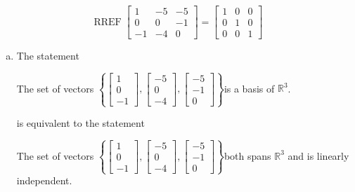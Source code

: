 \begin{exerciseAnswer} 


\[\operatorname{RREF} \left[\begin{array}{ccc}
1 & -5 & -5 \\
0 & 0 & -1 \\
-1 & -4 & 0
\end{array}\right] = \left[\begin{array}{ccc}
1 & 0 & 0 \\
0 & 1 & 0 \\
0 & 0 & 1
\end{array}\right] \]


\begin{enumerate}[(a)]
\item The statement 
\begin{center}\begin{minipage}{0.8\textwidth}
 The set of vectors \( \left\{ \left[\begin{array}{c}
1 \\
0 \\
-1
\end{array}\right] , \left[\begin{array}{c}
-5 \\
0 \\
-4
\end{array}\right] , \left[\begin{array}{c}
-5 \\
-1 \\
0
\end{array}\right] \right\} \)is a basis of \(\mathbb{R}^3\). 
\end{minipage}\end{center}
     is equivalent to the statement 
\begin{center}\begin{minipage}{0.8\textwidth}
 The set of vectors \( \left\{ \left[\begin{array}{c}
1 \\
0 \\
-1
\end{array}\right] , \left[\begin{array}{c}
-5 \\
0 \\
-4
\end{array}\right] , \left[\begin{array}{c}
-5 \\
-1 \\
0
\end{array}\right] \right\} \)both spans \(\mathbb{R}^3\) and is linearly independent.
\end{minipage}\end{center}
    

\end{enumerate}
\end{exerciseAnswer}
